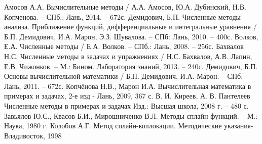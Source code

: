 \begin{thebibliography}{9}
        Амосов А.А. Вычислительные методы / А.А. Амосов, Ю.А. Дубинский, Н.В. Копченова. – СПб.: Лань, 2014. – 672с.
        Демидович, Б.П. Численные методы анализа. Приближение функций, дифференциальные и интегральные уравнения / Б.П. Демидович, И.А. Марон, Э.З. Шувалова. – СПб: Лань, 2010. – 400с.
        Волков, Е.А. Численные методы / Е.А. Волков. – СПб.: Лань, 2008. – 256с.
        Бахвалов Н.С. Численные методы в задачах и упражнениях / Н.С. Бахвалов, А.В. Лапин,  Е.В. Чижонков. – М.: Бином. Лаборатория знаний, 2013. – 240с.
        Демидович, Б.П. Основы вычислительной математики / Б.П. Демидович, И.А. Марон. – СПб: Лань, 2011. – 672с.
        Копчёнова Н.В., Марон И.А. Вычислительная математика в примерах и задачах, 2-е изд - Лань, 2009, 367 с. 
        В. И. Киреев, А. В. Пантелеев Численные методы в примерах и задачах Изд.: Высшая школа, 2008 г. – 480 с.
        Завьялов Ю.С., Квасов Б.И., Мирошниченко В.Л. Методы сплайн-функций. – М.: Наука, 1980 г.
        Колобов А.Г. Метод сплайн-коллокации. Методические указания- Владивосток, 1998 
    


\end{thebibliography}